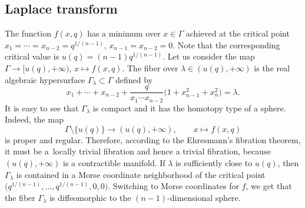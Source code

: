 \documentclass[10pt,a4paper]{article}
\numberwithin{equation}{section}
\begin{document}
\subsection{Laplace transform}
The function $f(x,q)$ has a minimum over $x\in \Gamma$ achieved at the
critical point $x_1=\cdots = x_{n-2}=q^{1/(n-1)}$,
$x_{n-1}=x_{n-2}=0$. Note that the corresponding critical value is
$u(q) = (n-1) q^{1/(n-1)}$. Let us consider the map $\Gamma\to
[u(q),+\infty)$, $x\mapsto f(x,q)$. The fiber over $\lambda \in
(u(q),+\infty)$ is the real algebraic hypersurface $\Gamma_\lambda\subset
\Gamma$ defined by
\[
x_1+\cdots + x_{n-2} +
\frac{q}{x_1\cdots x_{n-2}}
\bigl(1+x_{n-1}^2+x_n^2\bigr) = \lambda.
\]
It is easy to see that $\Gamma_\lambda$ is compact and it has the homotopy
type of a sphere. Indeed, the map
\[
\Gamma\setminus{\{u(q)\}}\to (u(q),+\infty),\qquad
x\mapsto f(x,q)
\]
is proper and regular. Therefore, according to the
Ehresmann's fibration theorem, it must be a~locally trivial fibration and hence
a trivial fibration, because $(u(q),+\infty)$ is a contractible
manifold. If $\lambda$ is sufficiently close to $u(q)$, then
$\Gamma_\lambda$ is contained in a Morse coordinate neighborhood of the
critical point $\big(q^{1/(n-1)},\dots, q^{1/(n-1)},0,0\big)$. Switching to
Morse coordinates for $f$, we get that the fiber $\Gamma_\lambda$ is
diffeomorphic to the $(n-1)$-dimensional sphere.
\end{document}
